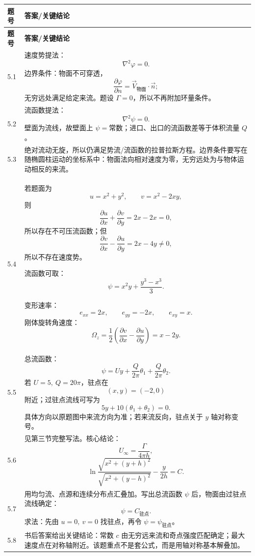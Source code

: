 \documentclass[UTF8,zihao=-4]{ctexart}
\begin{document}
\begin{longtable}{p{1.3cm}p{12.6cm}}
\toprule
\textbf{题号} & \textbf{答案/关键结论}\\
\midrule
\endfirsthead
\toprule
\textbf{题号} & \textbf{答案/关键结论}\\
\midrule
\endhead

5.1 &
速度势提法：
\[
\nabla^2\varphi=0.
\]
边界条件：物面不可穿透，
\[
\frac{\partial\varphi}{\partial n}=\vec V_{\text{物面}}\cdot\vec n;
\]
无穷远处满足给定来流。题设 $\Gamma=0$，所以不再附加环量条件。\\

5.2 &
流函数提法：
\[
\nabla^2\psi=0.
\]
壁面为流线，故壁面上 $\psi=\text{常数}$；进口、出口的流函数差等于体积流量 $Q$。\\

5.3 &
绝对流动无旋，所以仍满足势流/流函数的拉普拉斯方程。边界条件要写在随椭圆柱运动的坐标系中：物面法向相对速度为零，无穷远处为与物体运动相反的来流。\\

5.4 &
若题面为
\[
u=x^2+y^2,\qquad v=x^2-2xy,
\]
则
\[
\frac{\partial u}{\partial x}+\frac{\partial v}{\partial y}=2x-2x=0,
\]
所以存在不可压流函数；但
\[
\frac{\partial v}{\partial x}-\frac{\partial u}{\partial y}
=2x-4y\ne0,
\]
所以不存在速度势。

流函数可取：
\[
\psi=x^2y+\frac{y^3-x^3}{3}.
\]

变形速率：
\[
e_{xx}=2x,\qquad e_{yy}=-2x,\qquad e_{xy}=x.
\]
刚体旋转角速度：
\[
\Omega_z=\frac12\left(\frac{\partial v}{\partial x}-\frac{\partial u}{\partial y}\right)=x-2y.
\]\\

5.5 &
总流函数：
\[
\psi=Uy+\frac{Q}{2\pi}\theta_1+\frac{Q}{2\pi}\theta_2.
\]
若 $U=5,\ Q=20\pi$，驻点在
\[
(x,y)=(-2,0)
\]
附近；过驻点流线可写为
\[
5y+10(\theta_1+\theta_2)=0.
\]
具体方向以原题图中来流方向为准；若来流反向，驻点关于 $y$ 轴对称变号。\\

5.6 &
见第三节完整写法。核心结论：
\[
U_\infty=\frac{\Gamma}{4\pi h},
\]
\[
\ln\frac{\sqrt{x^2+(y+h)^2}}{\sqrt{x^2+(y-h)^2}}
-\frac{y}{2h}=C.
\]\\

5.7 &
用均匀流、点源和连续分布点汇叠加。写出总流函数 $\psi$ 后，物面由过驻点流线确定：
\[
\psi=C_{\text{驻点}}.
\]
求法：先由 $u=0,\ v=0$ 找驻点，再令 $\psi=\psi_{\text{驻点}}$。\\

5.8 &
书后答案给出关键结论：常数 $c$ 由无穷远来流和奇点强度匹配确定；最大速度点在对称轴附近。该题重点不是套公式，而是用轴对称基本解叠加。\\


\end{longtable}
\end{document}
